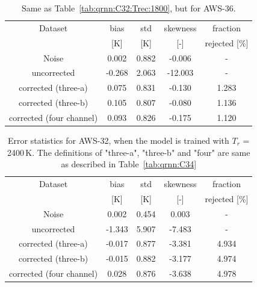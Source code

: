 \documentclass[12pt]{article}
\begin{document}
\begin{table}[!p]
	\centering
	\begin{tabular}[b]{c|c|c|c|c}
		Dataset  		  &   bias &   std &   skewness & fraction  \\
		&   [K]  &   [K] & [-] & rejected [\%]\\
		\hline
Noise                      &  0.002 & 0.882 &             -0.006 &      - \\
uncorrected                & -0.268 & 2.063 &            -12.003 &      - \\
corrected (three-a)        &  0.075 & 0.831 &             -0.130 &      1.283 \\
corrected (three-b)        &  0.105 & 0.807 &             -0.080 &      1.136 \\
corrected (four channel)   &  0.093 & 0.826 &             -0.175 &      1.120 \\
		\hline
	\end{tabular}
	\caption{ Same as Table~\ref{tab:qrnn:C32:Trec:1800}, but for AWS-36.}
	\label{tab:qrnn:C36:Trec:1800}
\end{table}


%
\begin{table}[!p]
	\centering
	\begin{tabular}[b]{c|c|c|c|c}
		Dataset  		  &   bias &   std &   skewness & fraction  \\
		&   [K]  &   [K] & [-] & rejected [\%]\\
		\hline
Noise                       &  0.002 & 0.454 &              0.003 &      - \\
uncorrected                 & -1.343 & 5.907 &             -7.483 &      - \\
corrected (three-a)  		& -0.017 & 0.877 &             -3.381 &      4.934 \\
corrected (three-b)  		& -0.015 & 0.882 &             -3.177 &      4.974 \\
corrected (four channel)    &  0.028 & 0.876 &             -3.638 &      4.978 \\
		\hline
	\end{tabular}
	\caption{ Error statistics for AWS-32, when the model is trained with $T_r$ = 2400\,K. The definitions of "three-a", "three-b" and "four" are same as described in Table~\ref{tab:qrnn:C34}  }
	\label{tab:qrnn:C32:Trec:2400}
\end{table}
\end{document}
